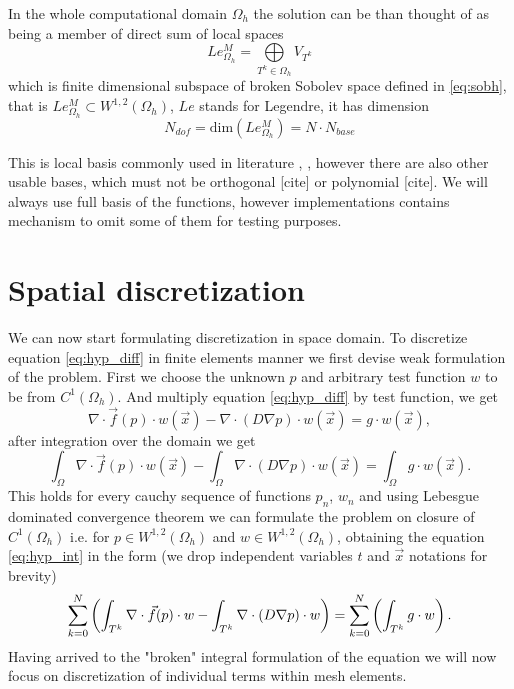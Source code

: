 In the whole computational domain $\Omega_h$ the solution can be than thought 
of as being a member of direct sum of local spaces
\begin{equation}
	Le_{\Omega_h}^{M} = \bigoplus\limits_{T^k \in \Omega_h} V_{T^k}
\end{equation}
which is finite dimensional subspace of broken Sobolev space defined in 
\eqref{eq:sobh}, 
that is $Le_{\Omega_h}^{M} \subset  W^{1,2}(\Omega_h)$, $Le$ stands for Legendre, it has 
dimension
\begin{equation}\label{eq:dim_legh}
	N_{dof} = \text{dim}(Le_{\Omega_h}^{M}) = N\cdot N_{base}
\end{equation}

This is local basis commonly used in literature \cite{Hesthaven2008}, 
\cite{Bokhove2008}, however there are also other usable bases, which must not 
be orthogonal [\todo cite] or polynomial [\todo cite]. We will always use full 
basis of the functions, however implementations contains mechanism to omit some 
of them for testing purposes.

\newpage
\section{Spatial discretization}
We can now start formulating discretization in space domain. To discretize 
equation \eqref{eq:hyp_diff} in finite elements manner we first devise weak 
formulation of the problem. First we choose the unknown $p$ and arbitrary test 
function $w$ to be from $C^1(\Omega_h)$. And multiply equation 
\eqref{eq:hyp_diff} by test function, we get
\begin{equation}
	\nabla\cdot \vec{f}(p)\cdot w(\vec{x}) 
	-  \nabla \cdot (D \nabla p)\cdot w( 
	\vec{x}) = g\cdot w(\vec{x}),
\end{equation}
after integration over the domain we get
\begin{equation}\label{eq:hyp_int}
	 \int_{\Omega}\nabla\cdot \vec{f}(p)\cdot w(\vec{x}) 
	 - \int_{\Omega}\nabla \cdot (D \nabla p)\cdot w(\vec{x}) 
	 = \int_{\Omega}g\cdot w(\vec{x}).
\end{equation}
This holds for every cauchy sequence of functions ${p_n}$, ${w_n}$ and using 
Lebesgue dominated convergence theorem we can formulate the problem on closure 
of $C^1(\Omega_h)$ i.e. for $p \in W^{1,2}(\Omega_h)$ and  $w \in 
W^{1,2}(\Omega_h)$, obtaining the equation \eqref{eq:hyp_int} in the form (we 
drop 
independent variables $t$ and $\vec{x}$ notations for brevity) 
\begin{equation}
	\label{eq:sum_int_hyp}
	\sum\limits_{k=0}^{N}\left(
	\int_{T^k}\nabla\cdot \vec{f}(p)\cdot w
	- \int_{T^k}\nabla \cdot (D \nabla p)\cdot w 
		\right)
 	=\sum\limits_{k=0}^{N}\left(\int_{T^k} g\cdot w\right).
\end{equation}
Having arrived to the "broken" integral formulation of the equation we will now 
focus on discretization of individual terms within mesh elements.

